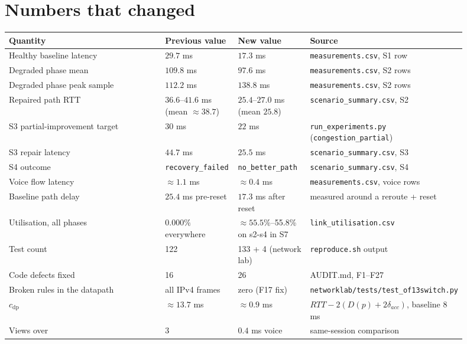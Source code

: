 \documentclass[11pt,a4paper]{article}
\begin{document}
\section{Numbers that changed}

\begin{longtable}{@{}p{0.40\linewidth}p{0.16\linewidth}p{0.16\linewidth}p{0.18\linewidth}@{}}
\textbf{Quantity} & \textbf{Previous value} & \textbf{New value} & \textbf{Source} \\
\midrule
Healthy baseline latency & $29.7$ ms & $17.3$ ms & \texttt{measurements.csv}, S1 row \\
Degraded phase mean & $109.8$ ms & $97.6$ ms & \texttt{measurements.csv}, S2 rows \\
Degraded phase peak sample & $112.2$ ms & $138.8$ ms & \texttt{measurements.csv}, S2 rows \\
Repaired path RTT & $36.6$--$41.6$ ms (mean $\approx 38.7$) &
$25.4$--$27.0$ ms (mean $25.8$) & \texttt{scenario\_summary.csv}, S2 \\
S3 partial-improvement target & $30$ ms & $22$ ms & \texttt{run\_experiments.py}
  (\texttt{congestion\_partial}) \\
S3 repair latency & $44.7$ ms & $25.5$ ms & \texttt{scenario\_summary.csv}, S3 \\
S4 outcome & \texttt{recovery\_failed} & \texttt{no\_better\_path} &
\texttt{scenario\_summary.csv}, S4 \\
Voice flow latency & $\approx 1.1$ ms & $\approx 0.4$ ms &
\texttt{measurements.csv}, voice rows \\
Baseline path delay & $25.4$ ms pre-reset & $17.3$ ms after reset &
measured around a reroute + reset \\
Utilisation, all phases & $0.000\%$ everywhere & ${\approx}55.5\%$--55.8\% on
s2-s4 in S7 & \texttt{link\_utilisation.csv} \\
Test count & 122 & 133 + 4 (network lab) & \texttt{reproduce.sh} output \\
Code defects fixed & 16 & 26 & AUDIT.md, F1--F27 \\
Broken rules in the datapath & all IPv4 frames & zero (F17 fix) &
\texttt{network\-lab/tests/test\_of13switch.py} \\
$c_{\mathrm{dp}}$ & $\approx 13.7$ ms & $\approx 0.9$ ms &
$RTT {-} 2(D(p){+}2\delta_{acc})$, baseline $8$ ms \\
Views over & $3$ & $0.4$ ms voice & same-session comparison \\
\bottomrule
\end{longtable}
\end{document}
